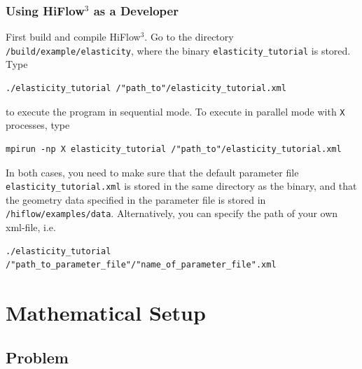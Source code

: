 \documentclass[a4paper, 11pt, twoside]{article}
\theoremstyle{plain}
\theoremstyle{definition}
\begin{document}
\subsubsection{Using HiFlow$^3$ as a Developer}\label{sectiondeveloper}


First build and compile HiFlow$^3$. 
Go to the directory \verb'/build/example/elasticity', where the binary \texttt{elasticity\_tutorial} is stored. 
Type
\begin{lstlisting}[breaklines]
  ./elasticity_tutorial /"path_to"/elasticity_tutorial.xml
\end{lstlisting}
to execute the program in sequential mode. 
To execute in parallel mode  with \verb'X' processes, type
\begin{lstlisting}[breaklines]
  mpirun -np X elasticity_tutorial /"path_to"/elasticity_tutorial.xml
\end{lstlisting}
In both cases, you need to make sure that the default parameter file \verb'elasticity_tutorial.xml' is stored in the same directory as the binary, and that the geometry data specified in the parameter file is stored in \verb'/hiflow/examples/data'. 
Alternatively, you can specify the path of your own xml-file, i.e.
\begin{lstlisting}[breaklines]
  ./elasticity_tutorial /"path_to_parameter_file"/"name_of_parameter_file".xml
\end{lstlisting}







\section{Mathematical Setup}

\subsection{Problem}
\label{ssec:problem_description}
\end{document}
